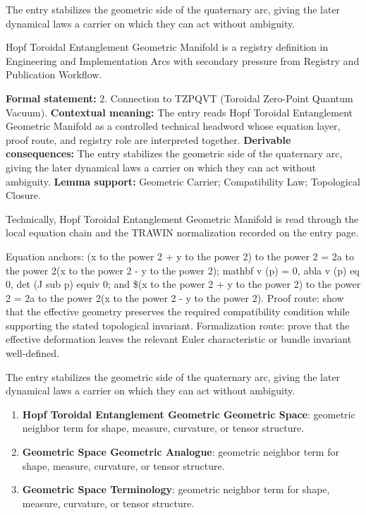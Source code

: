 The entry stabilizes the geometric side of the quaternary arc, giving the later dynamical laws a carrier on which they can act without ambiguity.
\clearpage


\begingroup\small
{}
Hopf Toroidal Entanglement Geometric Manifold is a registry definition in Engineering and Implementation Arcs with secondary pressure from Registry and Publication Workflow.

\begingroup\footnotesize\setlength{\emergencystretch}{3em}\sloppy
\textbf{Formal statement:} 2. Connection to TZPQVT (Toroidal Zero-Point Quantum Vacuum). \textbf{Contextual meaning:} The entry reads Hopf Toroidal Entanglement Geometric Manifold as a controlled technical headword whose equation layer, proof route, and registry role are interpreted together. \textbf{Derivable consequences:} The entry stabilizes the geometric side of the quaternary arc, giving the later dynamical laws a carrier on which they can act without ambiguity. \textbf{Lemma support:} Geometric Carrier; Compatibility Law; Topological Closure.\par
\endgroup

Technically, Hopf Toroidal Entanglement Geometric Manifold is read through the local equation chain and the TRAWIN normalization recorded on the entry page.

Equation anchors: (x to the power 2 + y to the power 2) to the power 2 = 2a to the power 2(x to the power 2 - y to the power 2); mathbf v (p) = 0, abla v (p) eq 0, det (J sub p) equiv 0; and \$(x to the power 2 + y to the power 2) to the power 2 = 2a to the power 2(x to the power 2 - y to the power 2). Proof route: show that the effective geometry preserves the required compatibility condition while supporting the stated topological invariant. Formalization route: prove that the effective deformation leaves the relevant Euler characteristic or bundle invariant well-defined.

The entry stabilizes the geometric side of the quaternary arc, giving the later dynamical laws a carrier on which they can act without ambiguity.
\endgroup

\begin{enumerate}[leftmargin=1.6em,itemsep=6pt,topsep=4pt]
\item \textbf{Hopf Toroidal Entanglement Geometric Geometric Space}: geometric neighbor term for shape, measure, curvature, or tensor structure.
\item \textbf{Geometric Space Geometric Analogue}: geometric neighbor term for shape, measure, curvature, or tensor structure.
\item \textbf{Geometric Space Terminology}: geometric neighbor term for shape, measure, curvature, or tensor structure.
\end{enumerate}

